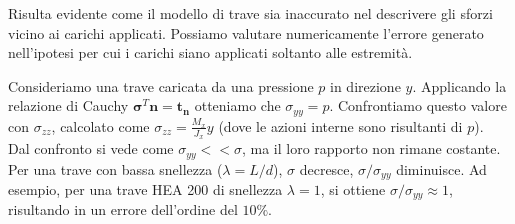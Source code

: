  Risulta evidente come il modello di trave sia inaccurato nel descrivere gli sforzi vicino ai carichi applicati. Possiamo valutare numericamente l'errore generato nell'ipotesi per cui i carichi siano applicati soltanto alle estremità.
 \begin{esempioBox}
     Consideriamo una trave caricata da una pressione $p$ in direzione $y$. Applicando la relazione di Cauchy  $\boldsymbol{\sigma}^T\mathbf{n}=\mathbf{t_n}$ otteniamo che $\sigma_{yy} = p$. Confrontiamo questo valore con $\sigma_{zz}$, calcolato come $\sigma_{zz} = \frac{M_x}{J_x}y$ (dove le azioni interne sono risultanti di $p$).\\
     Dal confronto si vede come $\sigma_{yy}<<\sigma$, ma il loro rapporto non rimane costante. Per una trave con bassa snellezza ($\lambda = L/d$), $\sigma$ decresce, $\sigma /\sigma_{yy}  $ diminuisce. Ad esempio, per una trave HEA 200 di snellezza $\lambda = 1$, si ottiene $\sigma /\sigma_{yy}  \approx1$, risultando in un errore dell'ordine del $10\%.$
 \end{esempioBox}

